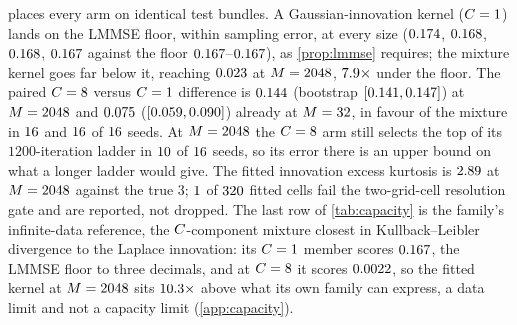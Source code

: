 
 places every arm on identical test bundles. A Gaussian-innovation
kernel ($C=1$) lands on the LMMSE floor, within sampling error, at every size
($0.174$, $0.168$, $0.168$, $0.167$ against the floor
$0.167$--$0.167$), as \cref{prop:lmmse} requires; the mixture kernel goes
far below it, reaching $0.023$ at $M=2048$, $7.9\times$ under the
floor. The paired $C=8$ versus $C=1$ difference is
$0.144$ (bootstrap $[0.141,0.147]$) at $M=2048$ and
$0.075$ ($[0.059,0.090]$) already at $M=32$, in favour of the
mixture in $16$ and $16$ of $16$ seeds. At $M=2048$ the
$C=8$ arm still selects the top of its $1200$-iteration ladder in $10$ of
$16$ seeds, so its error there is an upper bound on what a longer ladder would give. The fitted innovation
excess kurtosis is $2.89$ at $M=2048$ against the true $3$; $1$
of $320$ fitted cells fail the two-grid-cell resolution gate and are reported, not
dropped. The last row of \cref{tab:capacity} is the family's infinite-data reference, the
$C$-component mixture closest in Kullback--Leibler divergence to the Laplace
innovation: its $C=1$ member scores $0.167$, the LMMSE floor to three decimals,
and at $C=8$ it scores $0.0022$, so the fitted kernel at $M=2048$ sits
$10.3\times$ above what its own family can express, a data limit and not a
capacity limit (\cref{app:capacity}).
